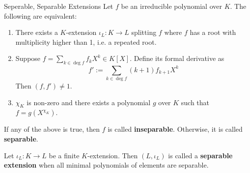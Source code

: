 \documentclass[../book.tex]{subfiles}
\begin{document}
\begin{dfn} Seperable, Separable Extensions
    Let $f$ be an irreducible polynomial over $K$. 
    The following are equivalent: 
    \begin{enumerate}
        \item There exists a $K$-extension $\iota_L : K \to L$ splitting $f$ where
        $f$ has a root with multiplicity higher than 1, i.e. a repeated root.
        \item Suppose $f = \sum_{k \in \deg f} f_k X^k \in K[X]$.
        Define its formal derivative as 
        \[ f' := \sum_{k \in \deg f} (k+1)f_{k+1}X^k \]
        Then $(f,f') \neq 1$.
        \item $\chi_K$ is non-zero and there exists a polynomial $g$ over $K$
        such that $f = g(X^{\chi_K})$.
    \end{enumerate}
    If any of the above is true, then $f$ is called \textbf{inseparable}.
    Otherwise, it is called \textbf{separable}.
    
    Let $\iota_L : K \to L$ be a finite $K$-extension.
    Then $(L,\iota_L)$ is called a \textbf{separable extension} when
    all minimal polynomials of elements are separable. 
\end{dfn}
\end{document}
